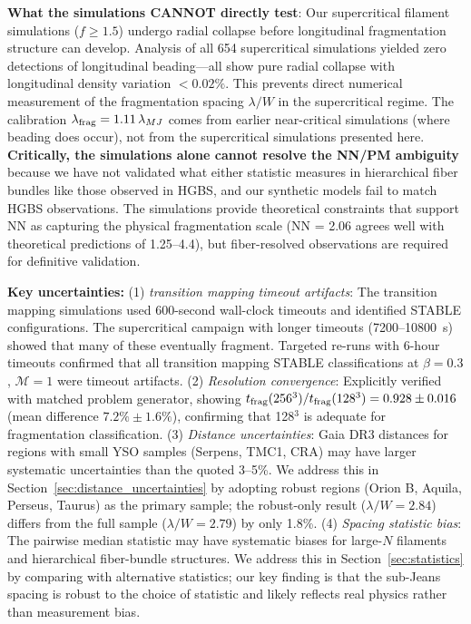 \documentclass[twoside,twocolumn]{mnras}
\begin{document}
\textbf{What the simulations CANNOT directly test}: Our supercritical filament simulations ($f \geq 1.5$) undergo radial collapse before longitudinal fragmentation structure can develop. Analysis of all 654 supercritical simulations yielded zero detections of longitudinal beading---all show pure radial collapse with longitudinal density variation $<0.02\%$. This prevents direct numerical measurement of the fragmentation spacing $\lambda/W$ in the supercritical regime. The calibration $\lambda_{\rm frag} = 1.11\,\lambda_{MJ}$ comes from earlier near-critical simulations (where beading does occur), not from the supercritical simulations presented here. \textbf{Critically, the simulations alone cannot resolve the NN/PM ambiguity} because we have not validated what either statistic measures in hierarchical fiber bundles like those observed in HGBS, and our synthetic models fail to match HGBS observations. The simulations provide theoretical constraints that support NN as capturing the physical fragmentation scale (NN = 2.06 agrees well with theoretical predictions of 1.25--4.4), but fiber-resolved observations are required for definitive validation.

\textbf{Key uncertainties:} (1) \textit{transition mapping timeout artifacts}: The transition mapping simulations used 600-second wall-clock timeouts and identified STABLE configurations. The supercritical campaign with longer timeouts (7200--10800~s) showed that many of these eventually fragment. Targeted re-runs with 6-hour timeouts confirmed that all transition mapping STABLE classifications at $\beta = 0.3$, $\mathcal{M} = 1$ were timeout artifacts. (2) \textit{Resolution convergence}: Explicitly verified with matched problem generator, showing $t_{\rm frag}(256^3)/t_{\rm frag}(128^3) = 0.928 \pm 0.016$ (mean difference $7.2\% \pm 1.6\%$), confirming that 128$^3$ is adequate for fragmentation classification. (3) \textit{Distance uncertainties}: Gaia DR3 distances for regions with small YSO samples (Serpens, TMC1, CRA) may have larger systematic uncertainties than the quoted 3--5\%. We address this in Section~\ref{sec:distance_uncertainties} by adopting robust regions (Orion B, Aquila, Perseus, Taurus) as the primary sample; the robust-only result ($\lambda/W = 2.84$) differs from the full sample ($\lambda/W = 2.79$) by only 1.8\%. (4) \textit{Spacing statistic bias}: The pairwise median statistic may have systematic biases for large-$N$ filaments and hierarchical fiber-bundle structures. We address this in Section~\ref{sec:statistics} by comparing with alternative statistics; our key finding is that the sub-Jeans spacing is robust to the choice of statistic and likely reflects real physics rather than measurement bias.
\end{document}
